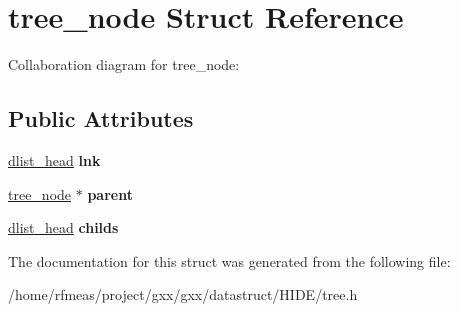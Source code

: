 \hypertarget{structtree__node}{}\section{tree\+\_\+node Struct Reference}
\label{structtree__node}


Collaboration diagram for tree\+\_\+node\+:
\subsection*{Public Attributes}
\begin{DoxyCompactItemize}
\item 
\hyperlink{structdlist__head}{dlist\+\_\+head} {\bfseries lnk}\hypertarget{structtree__node_a9bfd7e5c564fdd0d8e1d31dcc82d96ba}{}\label{structtree__node_a9bfd7e5c564fdd0d8e1d31dcc82d96ba}

\item 
\hyperlink{structtree__node}{tree\+\_\+node} $\ast$ {\bfseries parent}\hypertarget{structtree__node_a649ed45f2f6567a59e9cd53024a8ba41}{}\label{structtree__node_a649ed45f2f6567a59e9cd53024a8ba41}

\item 
\hyperlink{structdlist__head}{dlist\+\_\+head} {\bfseries childs}\hypertarget{structtree__node_a6687b28c81a7285a834697762237be4e}{}\label{structtree__node_a6687b28c81a7285a834697762237be4e}

\end{DoxyCompactItemize}


The documentation for this struct was generated from the following file\+:\begin{DoxyCompactItemize}
\item 
/home/rfmeas/project/gxx/gxx/datastruct/\+H\+I\+D\+E/tree.\+h\end{DoxyCompactItemize}
